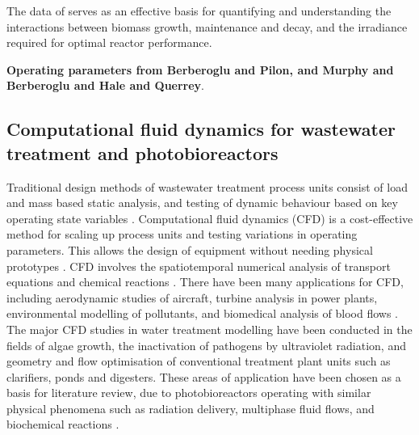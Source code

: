 The data of \cite{minkevich2004} serves as an effective basis for quantifying and understanding the interactions between biomass growth, maintenance and decay, and the irradiance required for optimal reactor performance.

\textbf{Operating parameters from Berberoglu and Pilon, and Murphy and Berberoglu and Hale and Querrey}.


\subsection{Computational fluid dynamics for wastewater treatment and photobioreactors}
Traditional design methods of wastewater treatment process units consist of load and mass based static analysis, and testing of dynamic behaviour based on key operating state variables \cite{gaden2013}. Computational fluid dynamics (CFD) is a cost-effective method for scaling up process units and testing variations in operating parameters. This allows the design of equipment without needing physical prototypes \cite{wood1995}. CFD involves the spatiotemporal numerical analysis of transport equations and chemical reactions \cite{versteeg2007}. There have been many applications for CFD, including aerodynamic studies of aircraft, turbine analysis in power plants, environmental modelling of pollutants, and biomedical analysis of blood flows \cite{versteeg1995}. The major CFD studies in water treatment modelling have been conducted in the fields of algae growth, the inactivation of pathogens by ultraviolet radiation, and geometry and flow optimisation of conventional treatment plant units such as clarifiers, ponds and digesters. These areas of application have been chosen as a basis for literature review, due to photobioreactors operating with similar physical phenomena such as radiation delivery, multiphase fluid flows, and biochemical reactions \cite{bitog2011}. 


